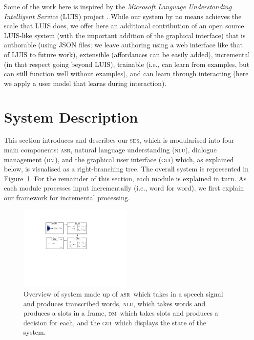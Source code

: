 \documentclass[11pt]{article}
\newcommand{\sds}[0]{\textsc{sds}}
\newcommand{\nlu}[0]{\textsc{nlu}}
\newcommand{\asr}[0]{\textsc{asr}}
\newcommand{\dm}[0]{\textsc{dm}}
\newcommand{\ui}[0]{\textsc{gui}}
\begin{document}
Some of the work here is inspired by the \emph{Microsoft Language Understanding Intelligent Service} (LUIS) project \cite{Williams2015_sigdial}. While our system by no means achieves the scale that LUIS does, we offer here an additional contribution of an open source LUIS-like system (with the important addition of the graphical interface) that is authorable (using JSON files; we leave authoring using a web interface like that of LUIS to future work), extensible (affordances can be easily added), incremental (in that respect going beyond LUIS), trainable (i.e., can learn from examples, but can still function well without examples), and can learn through interacting (here we apply a user model that learns during interaction). 

\section{System Description}
\label{section:system_def}

This section introduces and describes our \sds, which is modularised into four main components: \asr, natural language understanding (\nlu), dialogue management (\dm), and the graphical user interface (\ui) which, as explained below, is visualised as a right-branching tree. The overall system is represented in Figure~\ref{fig:overview}. For the remainder of this section, each module is explained in turn. As each module processes input incrementally (i.e., word for word), we first explain our framework for incremental processing.

\begin{figure}[ht]
  \centering
      \includegraphics[width=0.5\textwidth]{figures/sig16-overview.pdf}	
      \caption{Overview of system made up of \asr\ which takes in a speech signal and produces transcribed words, \nlu, which takes words and produces a slots in a frame, \dm\ which takes slots and produces a decision for each, and the \ui\ which displays the state of the system. \label{fig:overview}}
\end{figure}
\vspace{-0.25cm}
\end{document}
